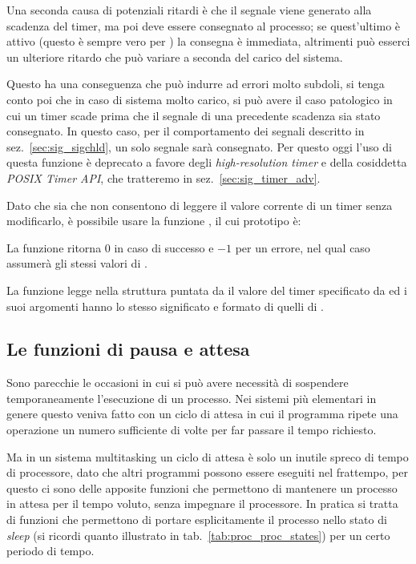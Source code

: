 Una seconda causa di potenziali ritardi è che il segnale viene generato alla
scadenza del timer, ma poi deve essere consegnato al processo; se quest'ultimo
è attivo (questo è sempre vero per ) la consegna è
immediata, altrimenti può esserci un ulteriore ritardo che può variare a
seconda del carico del sistema.

Questo ha una conseguenza che può indurre ad errori molto subdoli, si tenga
conto poi che in caso di sistema molto carico, si può avere il caso patologico
in cui un timer scade prima che il segnale di una precedente scadenza sia
stato consegnato. In questo caso, per il comportamento dei segnali descritto
in sez.~\ref{sec:sig_sigchld}, un solo segnale sarà consegnato. Per questo
oggi l'uso di questa funzione è deprecato a favore degli
\textit{high-resolution timer} e della cosiddetta \textit{POSIX Timer API},
che tratteremo in sez.~\ref{sec:sig_timer_adv}.

Dato che sia  che  non consentono di leggere il
valore corrente di un timer senza modificarlo, è possibile usare la funzione
, il cui prototipo è:

\begin{funcproto}{
}

{ La funzione ritorna $0$ in caso di successo e $-1$ per un errore, nel qual
  caso  assumerà gli stessi valori di .  }
\end{funcproto}

La funzione legge nella struttura  puntata da 
il valore del timer specificato da  ed i suoi argomenti hanno lo
stesso significato e formato di quelli di .


\subsection{Le funzioni di pausa e attesa}
\label{sec:sig_pause_sleep}

Sono parecchie le occasioni in cui si può avere necessità di sospendere
temporaneamente l'esecuzione di un processo. Nei sistemi più elementari in
genere questo veniva fatto con un ciclo di attesa in cui il programma ripete
una operazione un numero sufficiente di volte per far passare il tempo
richiesto.

Ma in un sistema multitasking un ciclo di attesa è solo un inutile spreco di
tempo di processore, dato che altri programmi possono essere eseguiti nel
frattempo, per questo ci sono delle apposite funzioni che permettono di
mantenere un processo in attesa per il tempo voluto, senza impegnare il
processore. In pratica si tratta di funzioni che permettono di portare
esplicitamente il processo nello stato di \textit{sleep} (si ricordi quanto
illustrato in tab.~\ref{tab:proc_proc_states}) per un certo periodo di tempo.

